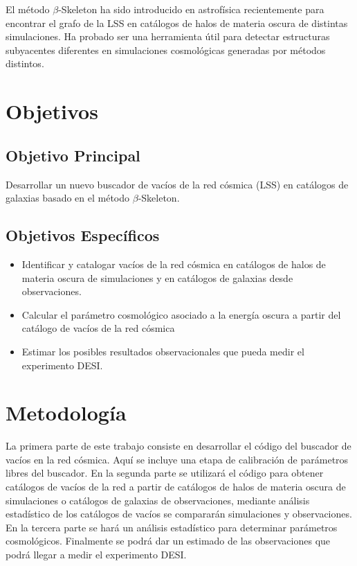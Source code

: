 \documentclass[preprint]{aastex62}
\begin{document}
  El método $\beta$-Skeleton ha sido introducido en astrofísica recientemente \citep{Fang2018} para
  encontrar el grafo de la LSS en catálogos de halos de materia oscura de distintas simulaciones.
  Ha probado ser una herramienta útil para detectar estructuras subyacentes diferentes en
  simulaciones cosmológicas generadas por métodos distintos.
  

  \section{Objetivos}

  \subsection{Objetivo Principal}
  Desarrollar un nuevo buscador de vacíos de la red cósmica (LSS) en catálogos de galaxias
  basado en el método $\beta$-Skeleton.
  
  \subsection{Objetivos Específicos}

  \begin{itemize}

      \item Identificar y catalogar vacíos de la red cósmica en catálogos de halos de materia oscura de
  simulaciones y en catálogos de galaxias desde observaciones.

      \item Calcular el parámetro cosmológico asociado a la energía oscura a partir del catálogo de
  vacíos de la red cósmica

    \item  Estimar los posibles resultados observacionales que pueda medir el experimento DESI.
  \end{itemize}
  
  \section{Metodología}

  La primera parte de este trabajo consiste en desarrollar el código del buscador de vacíos
  en la red cósmica. Aquí se incluye una etapa de calibración de parámetros libres del buscador.
  En la segunda parte se utilizará el código para obtener catálogos
  de vacíos de la red a partir de catálogos de halos de materia oscura de simulaciones o
  catálogos de galaxias de observaciones, mediante análisis estadístico de los catálogos de
  vacíos se compararán simulaciones y observaciones.
  En la tercera parte se hará un análisis estadístico para determinar parámetros cosmológicos.
  Finalmente se podrá dar un estimado de las observaciones que podrá llegar a medir el
  experimento DESI.
\end{document}
